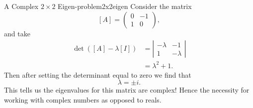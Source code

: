         \begin{ex}{A Complex $2\times 2$ Eigen-problem}{2x2eigen}
         Consider the matrix
         \[
         [A]=\begin{pmatrix} 0 & -1 \\ 1 & 0 \end{pmatrix},
         \]
         and take
         \begin{align*}
             \det([A]-\lambda [I])&= \left| \begin{matrix} -\lambda & -1 \\ 1 & -\lambda \end{matrix} \right|\\
             &= \lambda^2+1.
         \end{align*}
         Then after setting the determinant equal to zero we find that
         \[
         \lambda = \pm i.
         \]
         This tells us the eigenvalues for this matrix are complex! Hence the necessity for working with complex numbers as opposed to reals.
         

\end{ex}
